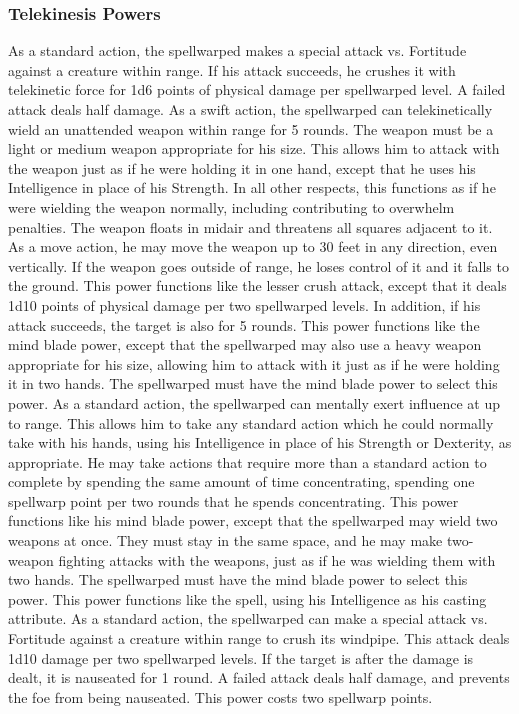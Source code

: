 \subsubsection{Telekinesis Powers}
As a standard action, the spellwarped makes a special attack vs. Fortitude against a creature within \rngclose range.
If his attack succeeds, he crushes it with telekinetic force for 1d6 points of physical damage  per spellwarped level.
A failed attack deals half damage.
As a swift action, the spellwarped can telekinetically wield an unattended weapon within \rngclose range for 5 rounds.
The weapon must be a light or medium weapon appropriate for his size.
This allows him to attack with the weapon just as if he were holding it in one hand, except that he uses his Intelligence in place of his Strength.
In all other respects, this functions as if he were wielding the weapon normally, including contributing to overwhelm penalties.
The weapon floats in midair and threatens all squares adjacent to it.
As a move action, he may move the weapon up to 30 feet in any direction, even vertically.
If the weapon goes outside of \rngclose range, he loses control of it and it falls to the ground.
This power functions like the lesser crush attack, except that it deals 1d10 points of physical damage per two spellwarped levels.
In addition, if his attack succeeds, the target is also \sickened for 5 rounds.
This power functions like the mind blade power, except that the spellwarped may also use a heavy weapon appropriate for his size, allowing him to attack with it just as if he were holding it in two hands.
The spellwarped must have the mind blade power to select this power.
As a standard action, the spellwarped can mentally exert influence at up to \rngclose range.
This allows him to take any standard action which he could normally take with his hands, using his Intelligence in place of his Strength or Dexterity, as appropriate.
He may take actions that require more than a standard action to complete by spending the same amount of time concentrating, spending one spellwarp point per two rounds that he spends concentrating.
This power functions like his mind blade power, except that the spellwarped may wield two weapons at once.
They must stay in the same space, and he may make two-weapon fighting attacks with the weapons, just as if he was wielding them with two hands.
The spellwarped must have the mind blade power to select this power.
 This power functions like the 
spell, using his Intelligence as his casting attribute.
As a standard action, the spellwarped can make a special attack vs. Fortitude against a creature within \rngclose range to crush its windpipe.
This attack deals 1d10 damage per two spellwarped levels.
If the target is \bloodied after the damage is dealt, it is nauseated for 1 round.
A failed attack deals half damage, and prevents the foe from being nauseated.
This power costs two spellwarp points.

